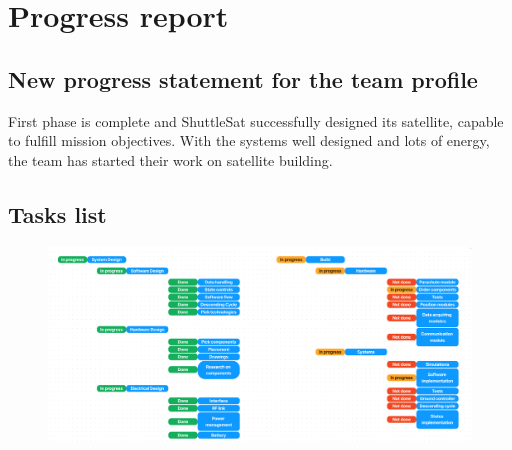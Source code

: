 \documentclass[11pt]{article}
\begin{document}


\tableofcontents
\pagestyle{plain}

\newpage





\section{Progress report}

\subsection{New progress statement for the team profile}
\hspace{0.5cm} First phase is complete and ShuttleSat successfully designed its satellite, capable to fulfill mission objectives. With the systems well designed and lots of energy, the team has started their work on satellite building.

\subsection{Tasks list}
\begin{figure}[hbt!]
\includegraphics[width=15cm]{Tasks list.png}
\centering
\end{figure}
\end{document}
